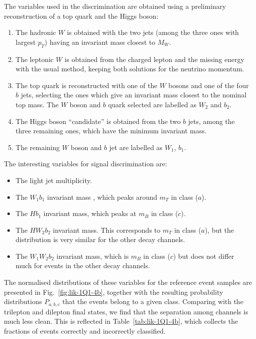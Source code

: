 \documentclass[12pt,a4paper]{article}
\begin{document}
%
The variables used in the discrimination are obtained using a preliminary reconstruction of a top quark and the Higgs boson:
\begin{enumerate}
\item The hadronic $W$ is obtained with the two jets (among the three ones with largest $p_T$) having an invariant mass closest to $M_W$.
\item The leptonic $W$ is obtained from the charged lepton and the missing energy with the usual method, keeping both solutions for the neutrino momentum.
\item The top quark is reconstructed with one of the $W$ bosons and one of the four $b$ jets, selecting the ones which give an invariant mass closest to the nominal top mass. The $W$ boson and $b$ quark selected are labelled as $W_2$ and $b_2$.
\item The Higgs boson ``candidate'' is obtained from the two $b$ jets, among the three remaining ones, which have the minimum invariant mass.
\item The remaining $W$ boson and $b$ jet are labelled as $W_1$, $b_1$.
\end{enumerate}
The interesting variables for signal discrimination are:
\begin{itemize}
\item The light jet multiplicity.
\item The $W_1 b_1$ invariant mass , which peaks around $m_T$ in class ($a$).
\item The $H b_1$ invariant mass, which peaks at $m_B$ in class ($c$).
\item The $H W_2 b_2$ invariant mass. This corresponds to $m_T$ in class ($a$), but the distribution is very similar for the other decay channels.
\item The $W_1 W_2 b_2$ invariant mass, which is $m_B$ in class ($c$) but does not differ much for events in the other decay channels.
\end{itemize}
The normalised distributions of these variables for the reference event samples are presented in Fig.~\ref{fig:lik-1Q1-4b}, together with the resulting probability distributions $P_{a,b,c}$ that the events belong to a given class. Comparing with the trilepton and dilepton final states, we find that the separation among channels is much less clean. This is reflected in Table~\ref{tab:lik-1Q1-4b}, which collects the fractions of events correctly and incorrectly classified.
%
\end{document}
